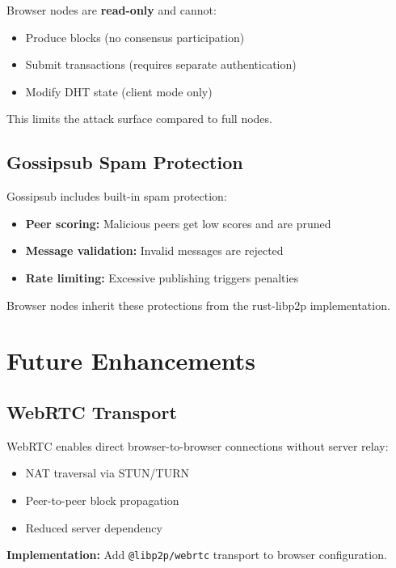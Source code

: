 \documentclass[11pt,a4paper]{article}
\begin{document}
Browser nodes are \textbf{read-only} and cannot:

\begin{itemize}
    \item Produce blocks (no consensus participation)
    \item Submit transactions (requires separate authentication)
    \item Modify DHT state (client mode only)
\end{itemize}

This limits the attack surface compared to full nodes.

\subsection{Gossipsub Spam Protection}

Gossipsub includes built-in spam protection:

\begin{itemize}
    \item \textbf{Peer scoring:} Malicious peers get low scores and are pruned
    \item \textbf{Message validation:} Invalid messages are rejected
    \item \textbf{Rate limiting:} Excessive publishing triggers penalties
\end{itemize}

Browser nodes inherit these protections from the rust-libp2p implementation.

\section{Future Enhancements}

\subsection{WebRTC Transport}

WebRTC enables direct browser-to-browser connections without server relay:

\begin{itemize}
    \item NAT traversal via STUN/TURN
    \item Peer-to-peer block propagation
    \item Reduced server dependency
\end{itemize}

\textbf{Implementation:} Add \texttt{@libp2p/webrtc} transport to browser configuration.
\end{document}
